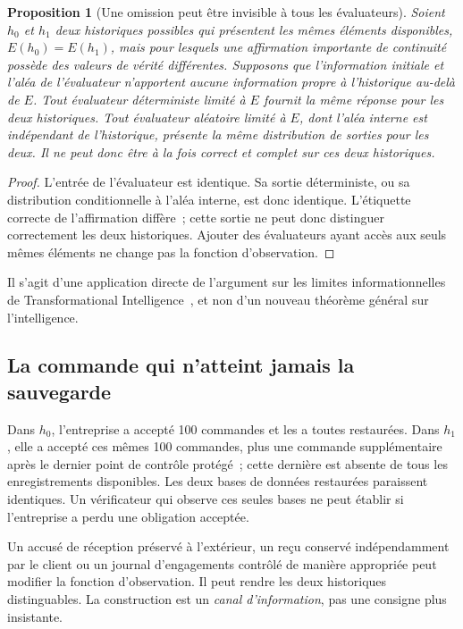 \documentclass[11pt,a4paper]{article}
\newcommand{\ti}{Transformational Intelligence}
\newtheorem{proposition}{Proposition}
\begin{document}
\begin{proposition}[Une omission peut être invisible à tous les évaluateurs]
Soient $h_0$ et $h_1$ deux historiques possibles qui présentent les mêmes éléments disponibles, $E(h_0)=E(h_1)$, mais pour lesquels une affirmation importante de continuité possède des valeurs de vérité différentes. Supposons que l’information initiale et l’aléa de l’évaluateur n’apportent aucune information propre à l’historique au-delà de $E$. Tout évaluateur déterministe limité à $E$ fournit la même réponse pour les deux historiques. Tout évaluateur aléatoire limité à $E$, dont l’aléa interne est indépendant de l’historique, présente la même distribution de sorties pour les deux. Il ne peut donc être à la fois correct et complet sur ces deux historiques.
\end{proposition}
\begin{proof}
L’entrée de l’évaluateur est identique. Sa sortie déterministe, ou sa distribution conditionnelle à l’aléa interne, est donc identique. L’étiquette correcte de l’affirmation diffère~; cette sortie ne peut donc distinguer correctement les deux historiques. Ajouter des évaluateurs ayant accès aux seuls mêmes éléments ne change pas la fonction d’observation.\end{proof}
Il s’agit d’une application directe de l’argument sur les limites informationnelles de \ti\ \cite[théorème 3.1]{boucherTI}, et non d’un nouveau théorème général sur l’intelligence.

\subsection{La commande qui n’atteint jamais la sauvegarde}
Dans $h_0$, l’entreprise a accepté 100 commandes et les a toutes restaurées. Dans $h_1$, elle a accepté ces mêmes 100 commandes, plus une commande supplémentaire après le dernier point de contrôle protégé~; cette dernière est absente de tous les enregistrements disponibles. Les deux bases de données restaurées paraissent identiques. Un vérificateur qui observe ces seules bases ne peut établir si l’entreprise a perdu une obligation acceptée.

Un accusé de réception préservé à l’extérieur, un reçu conservé indépendamment par le client ou un journal d’engagements contrôlé de manière appropriée peut modifier la fonction d’observation. Il peut rendre les deux historiques distinguables. La construction est un \emph{canal d’information}, pas une consigne plus insistante.
\end{document}
